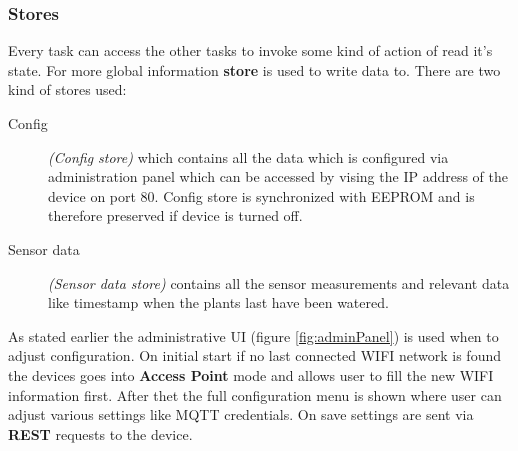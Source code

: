 \documentclass[11pt,a4paper]{article}
\begin{document}
\subsubsection{Stores}
Every task can access the other tasks to invoke some kind of action of read it's state. For more global information \textbf{store} is used to write data to. There are two kind of stores used: 

\begin{description}
\item [Config] \textit{(Config store)} which contains all the data which is configured via administration panel which can be accessed by vising the IP address of the device on port 80. Config store is synchronized with EEPROM and is therefore preserved if device is turned off. 
\item [Sensor data] \textit{(Sensor data store)} contains all the sensor measurements and  relevant data like timestamp when the plants last have been watered.
\end{description}

As stated earlier the administrative UI (figure \ref{fig:adminPanel}) is used when to adjust configuration. On initial start if no last connected WIFI network is found the devices goes into \textbf{Access Point} mode and allows user to fill the new WIFI information first. After thet the full configuration menu is shown where user can adjust various settings like MQTT credentials. On save settings are sent via \textbf{REST} requests to the device.
\end{document}

